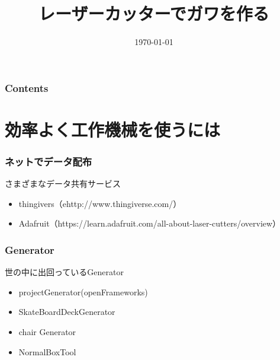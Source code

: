 \documentclass[10pt, dvipdfmx]{beamer}
\title{レーザーカッターでガワを作る}
\author{}
\institute[所属]{}
\date{\today}
\begin{document}
    \begin{frame}[plain]
        \frametitle{}
	    \titlepage
    \end{frame}

    \begin{frame}
        \frametitle{Contents}
        \tableofcontents
    \end{frame}

    \section{効率よく工作機械を使うには}
        \begin{frame}
            \frametitle{ネットでデータ配布}
            \begin{block}{さまざまなデータ共有サービス}
                \begin{itemize}
                    \item thingivers（ehttp://www.thingiverse.com/）
                    \item Adafruit（https://learn.adafruit.com/all-about-laser-cutters/overview）
                \end{itemize}
            \end{block}
        \end{frame}

        \begin{frame}
            \frametitle{Generator}
            \begin{block}{世の中に出回っているGenerator}
                \begin{itemize}
                    \item projectGenerator(openFrameworks)
                    \item SkateBoardDeckGenerator
                    \item chair Generator
                    \item NormalBoxTool
                \end{itemize}
            \end{block}
        \end{frame}

\end{document}
